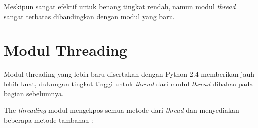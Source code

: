 \documentclass [12pt,a4paper,notitlepage,oneside,bahasa]{article}
\begin{document}
\vspace{12pt}
Meskipun sangat efektif untuk benang tingkat rendah, namun modul \textit{thread} sangat terbatas dibandingkan dengan modul yang baru. \par
\vspace{12pt}
\section{ Modul Threading } \par

Modul threading yang lebih baru disertakan dengan Python 2.4 memberikan jauh lebih kuat, dukungan tingkat tinggi untuk \textit{thread}\textit{ }dari modul\textit{ }\textit{thread}\textit{ }dibahas pada bagian sebelumnya. \par
The \textit{thread}\textit{ing }modul mengekpos semua metode dari \textit{thread}\textit{ }dan menyediakan beberapa metode tambahan : \par
\end{document}
